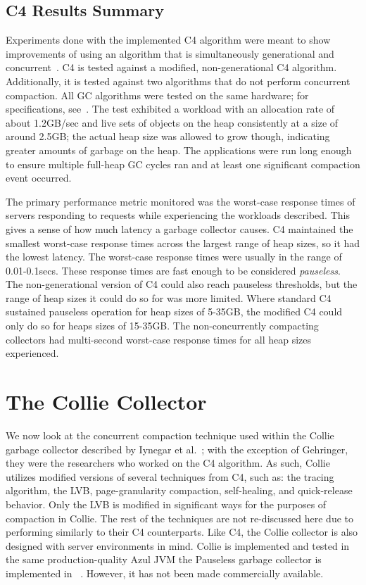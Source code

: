 \documentclass{sig-alternate}
\begin{document}
\subsection{C4 Results Summary}
\label{sec:c4Results}

Experiments done with the implemented C4 algorithm were meant to show improvements
of using an algorithm that is simultaneously generational and concurrent~\cite{Tene:C4}.
C4 is tested against a modified, non-generational C4 algorithm. Additionally,
it is tested against two algorithms that do not perform concurrent compaction. 
All GC algorithms were tested on the same hardware; for specifications, see~\cite{Tene:C4}. 
The test exhibited a workload with
an allocation rate of about 1.2GB/sec and live sets of objects on 
the heap consistently at a size of around 2.5GB; the actual heap size was allowed 
to grow though, indicating greater amounts of garbage on the heap. The applications were run long
enough to ensure multiple full-heap GC cycles ran and at least one
significant compaction event occurred.

The primary performance metric monitored was the worst-case response times
of servers responding to requests while experiencing the workloads
described. This gives a sense of how much latency a garbage collector causes. 
C4 maintained the smallest 
worst-case response times across the largest range of heap sizes, so
it had the lowest latency.
The worst-case response times were usually in the range of 0.01-0.1secs. 
These response times are fast enough to be considered \emph{pauseless}. 
The non-generational version of C4 could also reach pauseless thresholds,
but the range of heap sizes it could do so for was more limited. Where standard
C4 sustained pauseless operation for heap sizes of 5-35GB, the modified C4 could
only do so for heaps sizes of 15-35GB. The non-concurrently compacting
collectors had multi-second worst-case response times for all heap sizes experienced.


\section{The Collie Collector}
\label{sec:collie}

We now look at the concurrent compaction technique used within the 
Collie garbage collector described by Iynegar et al.~\cite{Iyengar:Collie};
with the exception of Gehringer, they were the researchers who worked on the C4 algorithm.
As such, Collie utilizes modified versions of several techniques from C4, such as:
the tracing algorithm, the LVB, page-granularity compaction, self-healing, and quick-release behavior.
Only the LVB is modified in significant ways for the purposes of compaction in Collie.
The rest of the techniques are not re-discussed here due to performing 
similarly to their C4 counterparts. Like C4, the Collie
collector is also designed with server environments in mind. Collie is implemented and tested in 
the same production-quality Azul JVM the Pauseless garbage collector is implemented in
~\cite{Click:Pauseless}. However, it has not been made commercially available.
\end{document}
